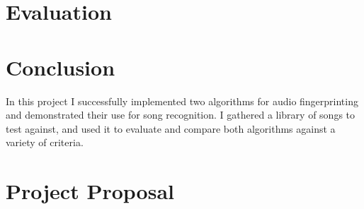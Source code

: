\documentclass[12pt,a4paper,twoside,openright]{report}
\begin{document}

\chapter{Evaluation}
\label{evaluation}



\chapter{Conclusion}
\label{conclusion}

In this project I successfully implemented two algorithms for audio fingerprinting and demonstrated their use for song recognition. I gathered a library of songs to test against, and used it to evaluate and compare both algorithms against a variety of criteria.






\appendix


\chapter{Project Proposal}


\end{document}
